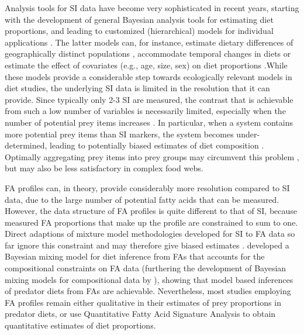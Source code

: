 \documentclass[fleqn,10pt]{wlpeerj}
\begin{document}
Analysis tools for SI data have become very sophisticated in recent
years, starting with the development of general Bayesian analysis
tools for estimating diet proportions, and leading to customized
(hierarchical) models for individual applications \citep{moore_incorporating_2008,hopkins_estimating_2012,parnell_bayesian_2012}. The latter models
can, for instance, estimate dietary differences of geographically
distinct populations \citep{semmens_quantifying_2009}, accommodate temporal
changes in diets or estimate the effect of covariates (e.g., age,
size, sex) on diet proportions \citep{parnell_bayesian_2012}.While these
models provide a considerable step towards ecologically relevant
models in diet studies, the underlying SI data is limited in the
resolution that it can provide. Since typically only 2-3 SI are
measured, the contrast that is achievable from such a low number of
variables is necessarily limited, especially when the number of
potential prey items increases \citep{phillips_source_2003,ward_quantitative_2011}. In particular, when a system contains more potential prey items than SI markers, the system becomes under-determined, leading to potentially biased estimates of diet composition \citep{ phillips_source_2003, fry_alternative_2013,semmens_statistical_2013,fry_minmax_2013, brett_resource_2014}. Optimally aggregating prey items into prey groups may
circumvent this problem \citep{ward_quantitative_2011}, but may also be less
satisfactory in complex food webs.

FA profiles can, in theory, provide considerably more resolution compared
to SI data, due to the large number of potential fatty acids that can be
measured. However, the data structure of FA profiles is quite different to that of SI, because measured FA proportions that make up the profile are constrained to sum to one. Direct adaptions of mixture model methodologies developed for SI to FA data so far ignore this constraint \citep[e.g.,]{galloway2014quantitative,galloway2014diet} and may therefore give biased estimates \citep{aitchison1982statistical}. \citet{blanchard_inference_2011} developed a
Bayesian mixing model for diet inference from FAs that accounts for the compositional constraints on FA data (furthering the
development of Bayesian mixing models for compositional data by
\citet{billheimer_compositional_2001}), showing that model based
inferences of predator diets from FAs are
achievable. Nevertheless, most studies employing FA profiles remain either qualitative
in their estimates of prey proportions in predator diets, or use
Quantitative Fatty Acid Signature Analysis \citep[QFASA; ][]{iverson_quantitative_2004} to
obtain quantitative estimates of diet proportions. 
\end{document}
